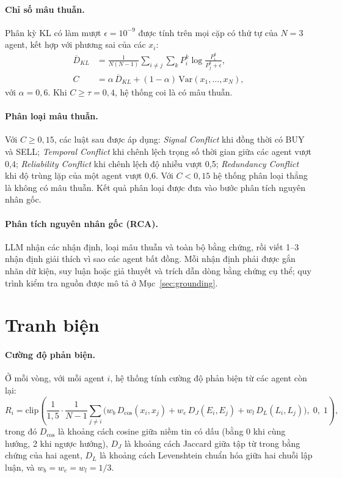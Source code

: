 \paragraph{Chỉ số mâu thuẫn.} Phân kỳ KL có làm mượt $\epsilon=10^{-9}$ được tính trên mọi cặp có thứ tự của $N=3$
agent, kết hợp với phương sai của các $x_i$:
\begin{align}
  \overline{D}_{KL} &= \frac{1}{N(N-1)}\sum_{i\neq j}\sum_{k}P_i^{k}\log\frac{P_i^{k}}{P_j^{k}+\epsilon},\\
  C &= \alpha\,\overline{D}_{KL} + (1-\alpha)\,\mathrm{Var}(x_1,\dots,x_N),
\end{align}
với $\alpha=0{,}6$. Khi $C\geq\tau=0{,}4$, hệ thống coi là có mâu thuẫn.

\paragraph{Phân loại mâu thuẫn.} Với $C\geq0{,}15$, các luật sau được áp dụng: \emph{Signal Conflict} khi đồng thời có
BUY và SELL; \emph{Temporal Conflict} khi chênh lệch trọng số thời gian giữa các agent vượt 0,4; \emph{Reliability
Conflict} khi chênh lệch độ nhiễu vượt 0,5; \emph{Redundancy Conflict} khi độ trùng lặp của một agent vượt 0,6. Với
$C<0{,}15$ hệ thống phân loại thẳng là không có mâu thuẫn. Kết quả phân loại được đưa vào bước phân tích nguyên
nhân gốc.

\paragraph{Phân tích nguyên nhân gốc (RCA).} LLM nhận các nhận định, loại mâu thuẫn và toàn bộ bằng chứng, rồi viết
1--3 nhận định giải thích vì sao các agent bất đồng. Mỗi nhận định phải được gắn nhãn dữ kiện, suy luận hoặc giả thuyết
và trích dẫn dòng bằng chứng cụ thể; quy trình kiểm tra nguồn được mô tả ở Mục~\ref{sec:grounding}.

\section{Tranh biện}
\label{sec:debate}
\paragraph{Cường độ phản biện.} Ở mỗi vòng, với mỗi agent $i$, hệ thống tính cường độ phản biện từ các agent còn lại:
\begin{equation}
  R_i = \mathrm{clip}\!\left(\frac{1}{1{,}5}\cdot\frac{1}{N-1}\sum_{j\neq i}\Big(w_b\,D_{\cos}(x_i,x_j) +
  w_e\,D_{J}(E_i,E_j) + w_l\,D_{L}(L_i,L_j)\Big),\;0,\;1\right),
\end{equation}
trong đó $D_{\cos}$ là khoảng cách cosine giữa niềm tin có dấu (bằng 0 khi cùng hướng, 2 khi ngược hướng), $D_J$ là
khoảng cách Jaccard giữa tập từ trong bằng chứng của hai agent, $D_L$ là khoảng cách Levenshtein chuẩn hóa giữa hai
chuỗi lập luận, và $w_b=w_e=w_l=1/3$.


